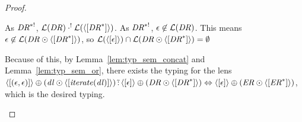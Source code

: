 \documentclass[numbers]{sigplanconf}
\begin{document}
\begin{proof}
\begin{description}
    As $\mathit{DR}^{*!}$, $\mathcal{L}(\mathit{DR}) \cdot^!
    \mathcal{L}(\langle[{\mathit{DR}}^*]\rangle)$.
    As $\mathit{DR}^{*!}$, $\epsilon\not\in\mathcal{L}(\mathit{DR})$.
    This means $\epsilon\not\in\mathcal{L}(\mathit{DR} \odot
      \langle[{\mathit{DR}}^*]\rangle)$, so
    $\mathcal{L}(\langle[\epsilon]\rangle) \cap
    \mathcal{L}(\mathit{DR} \odot \langle[{\mathit{DR}}^*]\rangle) =
    \emptyset$

    Because of this, by Lemma~\ref{lem:typ_sem_concat} and
    Lemma~\ref{lem:typ_sem_or}, there exists the typing
    for the lens
    $\langle[(\epsilon,\epsilon)]\rangle \oplus
    (\mathit{dl} \odot \langle[\mathit{iterate(\mathit{dl})}]\rangle)
    \,\tilde{:}\,
    \langle[\epsilon]\rangle \oplus (\mathit{DR} \odot
    \langle[{\mathit{DR}}^*]\rangle) \Leftrightarrow
    \langle[\epsilon]\rangle \oplus (\mathit{ER} \odot
    \langle[{\mathit{ER}}^*]\rangle)$, which is the desired typing.


\end{description}
\end{proof}
\end{document}
